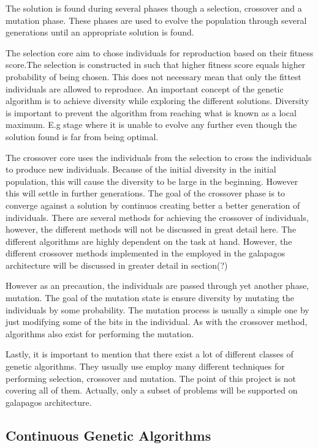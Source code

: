 The solution is found during several phases though a selection, crossover and a mutation phase. 
These phases are used to evolve the population through several generations until an appropriate 
solution is found. 

The selection core aim to chose individuals for reproduction based on their fitness score.The selection is constructed in such that higher fitness score equals higher probability of being chosen. This does not necessary mean that only the fittest individuals are allowed to reproduce. An important concept of the genetic algorithm is to achieve diversity while exploring the different solutions. Diversity is important to prevent the algorithm from reaching what is known as a local maximum. E.g stage where it is unable to evolve any further even though the solution found is far from being optimal.

The crossover core uses the individuals from the selection to cross the individuals to produce new individuals. Because of the initial diversity in the initial population, this will cause the diversity to be large in the beginning. However this will settle in further generations. The goal of the crossover phase is to converge against a solution by continuos creating better a better generation of individuals. There are several methods for achieving the crossover of individuals, however, the different methods will not be discussed in great detail here. The different algorithms are highly dependent on the task at hand. However, the different crossover methods implemented in the employed in the galapagos architecture will be discussed in greater detail in section(?) 

However as an precaution, the individuals are passed through yet another phase, mutation. The goal of the mutation state is ensure diversity by mutating the individuals by some probability. The mutation process is usually a simple one by just modifying some of the bits in the individual. As with the crossover method, algorithms also exist for performing the mutation. 

Lastly, it is important to mention that there exist a lot of different classes of genetic algorithms. They usually use employ many different techniques for performing selection, crossover and mutation. The point of this project is not covering all of them. Actually, only a subset of problems will be supported on galapagos architecture. 




\subsection{Continuous Genetic Algorithms}

